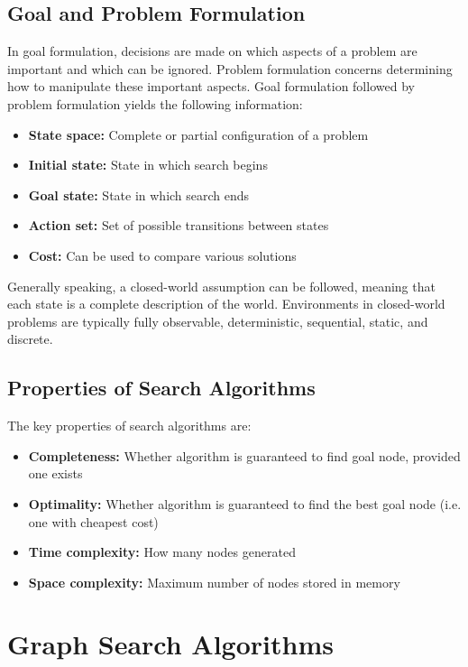 \documentclass[12pt,titlepage]{article}
\let\stdsection\section
\renewcommand\section{\clearpage\stdsection}
\begin{document}
    \subsection{Goal and Problem Formulation}
      In goal formulation, decisions are made on which aspects of a problem are important and which can be ignored. Problem
      formulation concerns determining how to manipulate these important aspects. Goal formulation followed by problem
      formulation yields the following information:
      \begin{itemize}
        \item \textbf{State space:} Complete or partial configuration of a problem
        \item \textbf{Initial state:} State in which search begins
        \item \textbf{Goal state:} State in which search ends
        \item \textbf{Action set:} Set of possible transitions between states
        \item \textbf{Cost:} Can be used to compare various solutions
      \end{itemize}

      Generally speaking, a closed-world assumption can be followed, meaning that each state is a complete description of the world.
      Environments in closed-world problems are typically fully observable, deterministic, sequential, static, and discrete.

    \subsection{Properties of Search Algorithms}
      The key properties of search algorithms are:
      \begin{itemize}
        \item \textbf{Completeness:} Whether algorithm is guaranteed to find goal node, provided one exists
        \item \textbf{Optimality:} Whether algorithm is guaranteed to find the best goal node (i.e. one with cheapest cost)
        \item \textbf{Time complexity:} How many nodes generated
        \item \textbf{Space complexity:} Maximum number of nodes stored in memory
      \end{itemize}

  \section{Graph Search Algorithms}
\end{document}
